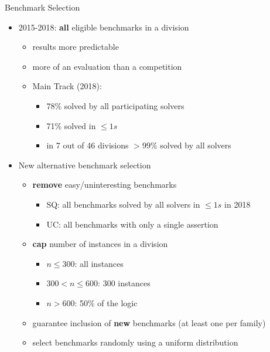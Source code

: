 \documentclass[10pt]{beamer}
\newcommand{\orange}[1]{\textcolor{mLightBrown}{#1}}
\begin{document}
  \begin{frame}{Benchmark Selection}
    \begin{itemize}
      \item \orange{2015-2018}: \textbf{all} eligible benchmarks in a division
        \begin{itemize}
          \item results more predictable
          \item more of an evaluation than a competition
          \item Main Track (2018):
            \begin{itemize}
              \item 78\% solved by all participating solvers
              \item 71\% solved in $\leq 1s$
              \item in 7 out of 46 divisions $> 99\%$ solved by all solvers
            \end{itemize}
        \end{itemize}
      \vspace{1ex}
      \item \orange{New} alternative benchmark selection
        \begin{itemize}
          \item \textbf{remove} easy/uninteresting benchmarks
            \begin{itemize}
              \item SQ:
                all benchmarks solved by all solvers in $\leq 1 s$ in 2018
              \item UC: all benchmarks with only a single assertion
            \end{itemize}

          \item \textbf{cap} number of instances in a division
            \begin{itemize}
              \item $n \leq 300$: all instances
              \item $300 < n \leq 600$: 300 instances
              \item $n > 600$: 50\% of the logic
            \end{itemize}

          \item guarantee inclusion of \textbf{new} benchmarks
            (at least one per family)

          \item select benchmarks randomly using a uniform distribution
        \end{itemize}
    \end{itemize}
  \end{frame}
\end{document}
